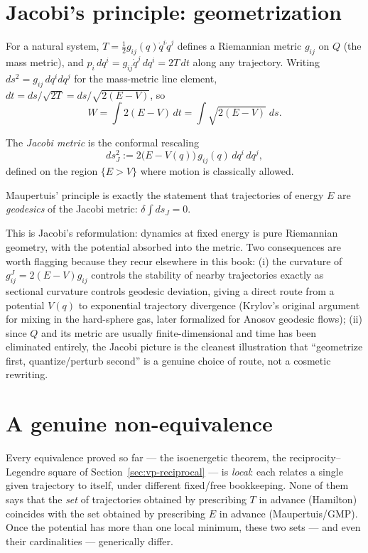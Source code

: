 \section{Jacobi's principle: geometrization}
\label{sec:vp-jacobi}

For a natural system, $T=\tfrac12 g_{ij}(q)\dot q^i\dot q^j$ defines a
Riemannian metric $g_{ij}$ on $Q$ (the mass metric), and $p_i\,dq^i =
g_{ij}\dot q^j\,dq^i = 2T\,dt$ along any trajectory. Writing
$ds^2=g_{ij}\,dq^idq^j$ for the mass-metric line element, $dt =
ds/\sqrt{2T}=ds/\sqrt{2(E-V)}$, so
\[
W=\int 2(E-V)\,dt = \int \sqrt{2(E-V)}\;ds .
\]

\begin{definition}
\label{jacobi-metric}
The \emph{Jacobi metric} is the conformal rescaling
\[
ds_J^2 := 2\big(E-V(q)\big)\,g_{ij}(q)\,dq^i\,dq^j,
\]
defined on the region $\{E>V\}$ where motion is classically allowed.
\end{definition}
Maupertuis' principle is exactly the statement that trajectories of energy $E$
are \emph{geodesics} of the Jacobi metric: $\delta\!\int ds_J = 0$.

This is Jacobi's reformulation: dynamics at fixed energy is pure Riemannian
geometry, with the potential absorbed into the metric. Two consequences are
worth flagging because they recur elsewhere in this book: (i) the curvature of
$g^J_{ij}=2(E-V)g_{ij}$ controls the stability of nearby trajectories exactly
as sectional curvature controls geodesic deviation, giving a direct route from
a potential $V(q)$ to exponential trajectory divergence (Krylov's original
argument for mixing in the hard-sphere gas, later formalized for Anosov
geodesic flows); (ii) since $Q$ and its metric are usually finite-dimensional
and time has been eliminated entirely, the Jacobi picture is the cleanest
illustration that ``geometrize first, quantize/perturb second'' is a genuine
choice of route, not a cosmetic rewriting.

\section{A genuine non-equivalence}
\label{sec:vp-nonequivalence}

Every equivalence proved so far ---  the isoenergetic theorem, the
reciprocity--Legendre square of Section~\ref{sec:vp-reciprocal} --- is
\emph{local}: each relates a single given trajectory to itself, under different
fixed/free bookkeeping. None of them says that the \emph{set} of trajectories
obtained by prescribing $T$ in advance (Hamilton) coincides with the set
obtained by prescribing $E$ in advance (Maupertuis/GMP). Once the potential has
more than one local minimum, these two sets --- and even their cardinalities
--- generically differ.


